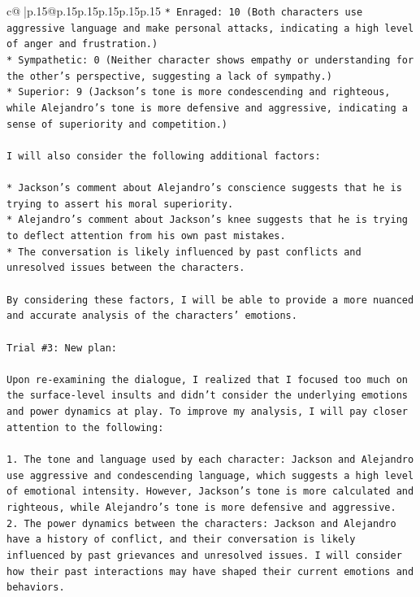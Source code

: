 \documentclass{article}
\begin{document}
{\begin{supertabular}{c@{$\;$}|p{.15\linewidth}@{}p{.15\linewidth}p{.15\linewidth}p{.15\linewidth}p{.15\linewidth}p{.15\linewidth}}
{{{\texttt{* Enraged: 10 (Both characters use aggressive language and make personal attacks, indicating a high level of anger and frustration.)} \\
\texttt{* Sympathetic: 0 (Neither character shows empathy or understanding for the other's perspective, suggesting a lack of sympathy.)} \\
\texttt{* Superior: 9 (Jackson's tone is more condescending and righteous, while Alejandro's tone is more defensive and aggressive, indicating a sense of superiority and competition.)} \\
\\ 
\texttt{I will also consider the following additional factors:} \\
\\ 
\texttt{* Jackson's comment about Alejandro's conscience suggests that he is trying to assert his moral superiority.} \\
\texttt{* Alejandro's comment about Jackson's knee suggests that he is trying to deflect attention from his own past mistakes.} \\
\texttt{* The conversation is likely influenced by past conflicts and unresolved issues between the characters.} \\
\\ 
\texttt{By considering these factors, I will be able to provide a more nuanced and accurate analysis of the characters' emotions.} \\
\\ 
\texttt{Trial \#3: New plan: } \\
\\ 
\texttt{Upon re{-}examining the dialogue, I realized that I focused too much on the surface{-}level insults and didn't consider the underlying emotions and power dynamics at play. To improve my analysis, I will pay closer attention to the following:} \\
\\ 
\texttt{1. The tone and language used by each character: Jackson and Alejandro use aggressive and condescending language, which suggests a high level of emotional intensity. However, Jackson's tone is more calculated and righteous, while Alejandro's tone is more defensive and aggressive.} \\
\texttt{2. The power dynamics between the characters: Jackson and Alejandro have a history of conflict, and their conversation is likely influenced by past grievances and unresolved issues. I will consider how their past interactions may have shaped their current emotions and behaviors.} \\
}}}
\end{supertabular}}
\end{document}
